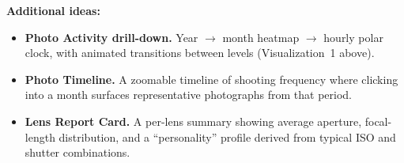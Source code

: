 \documentclass{article}
\begin{document}
\noindent\textbf{Additional ideas:}
\begin{itemize}[leftmargin=*, itemsep=0.4em]
  \item \textbf{Photo Activity drill-down.} Year $\to$ month heatmap $\to$ hourly polar clock, with animated transitions between levels (Visualization~1 above).
  \item \textbf{Photo Timeline.} A zoomable timeline of shooting frequency where clicking into a month surfaces representative photographs from that period.
  \item \textbf{Lens Report Card.} A per-lens summary showing average aperture, focal-length distribution, and a ``personality'' profile derived from typical ISO and shutter combinations.
\end{itemize}
\end{document}
